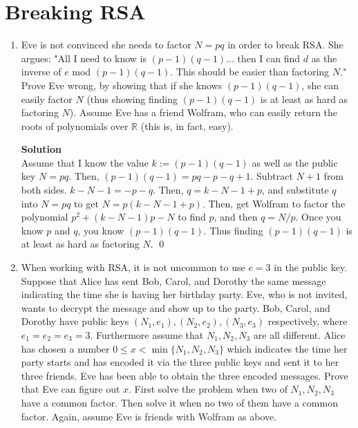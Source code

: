 \documentclass[11pt]{article}
\newcommand*{\Question}[1]{\section{#1}}
\newenvironment{Parts}{\begin{enumerate}[label=(\alph*)]}{\end{enumerate}}
\newcommand*{\Part}{\item}
\newcommand*{\R}{\mathbb{R}}
\begin{document}
\Question{Breaking RSA}
\begin{Parts}
    \Part Eve is not convinced she needs to factor $N = pq$ in order to break
        RSA.
        She argues: "All I need to know is $(p-1)(q-1)$... then I can find $d$
    as the inverse of $e$ mod $(p-1)(q-1)$. This should be easier than
    factoring $N$."
    Prove Eve wrong, by showing that if she knows $(p-1)(q-1)$,
  she can easily factor $N$ (thus showing finding $(p-1)(q-1)$ is at least
  as hard as factoring $N$). Assume Eve has a friend Wolfram, who can easily return the
    roots of polynomials over $\R$ (this is, in fact, easy).
\begin{mdframed} \textbf{Solution} \\
Assume that I know the value $k:=(p-1)(q-1)$ as well as the public key $N=pq$. Then, $(p-1)(q-1)=pq-p-q+1$. Subtract $N+1$ from both sides. $k-N-1=-p-q$. Then, $q=k-N-1+p$, and substitute $q$ into $N=pq$ to get $N=p(k-N-1+p)$. Then, get Wolfram to factor the polynomial $p^2+(k-N-1)p-N$ to find $p$, and then $q=N/p$. Once you know $p$ and $q$, you know $(p-1)(q-1)$. Thus finding $(p-1)(q-1)$ is at least as hard as factoring $N$. \qed
\end{mdframed}

  \Part When working with RSA, it is not uncommon to use $e=3$ in the public
        key. Suppose that Alice has sent Bob, Carol, and Dorothy the same
        message indicating the time she is having her birthday party. Eve, who is
        not invited, wants to decrypt the message and show up to the
        party.
        Bob, Carol, and Dorothy have public keys $(N_1, e_1), (N_2, e_2), (N_3,
        e_3)$ respectively, where $e_1=e_2=e_3=3$. Furthermore assume that $N_1,N_2,N_3$ are
        all different. Alice has chosen a number $0\leq x< \min\{N_1,N_2,N_3\}$ which
        indicates the time her party starts and has encoded it via the three
        public keys and sent it to her three friends. Eve has been able to
        obtain the three encoded messages. Prove that Eve can figure out $x$.
        First solve the problem when two of $N_1,N_2,N_3$ have a
        common factor. Then solve it when no two of them have a common factor.
        Again, assume Eve is friends with Wolfram as above.
        

\end{Parts}
\end{document}
